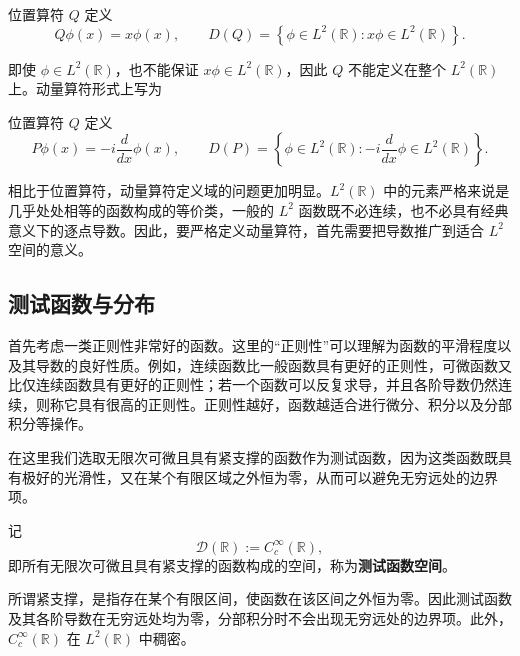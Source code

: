 \documentclass[UTF8,a4paper,11pt,openany]{ctexbook}
\begin{document}
\begin{definition}[位置算符]
位置算符 $Q$ 定义
\begin{equation}
    Q\phi(x)=x\phi(x),
    \qquad
    D(Q)
    =
    \left\{
    \phi\in L^2(\mathbb R):
    x\phi\in L^2(\mathbb R)
    \right\}.
\end{equation}
\end{definition}
即使 $\phi\in L^2(\mathbb R)$，也不能保证 $x\phi\in L^2(\mathbb R)$，因此 $Q$ 不能定义在整个 $L^2(\mathbb R)$ 上。动量算符形式上写为
\begin{definition}[动量算符]
位置算符 $Q$ 定义
\begin{equation}
    P\phi(x)=-i\frac{d}{dx}\phi(x),
    \qquad
    D(P)
    =
    \left\{
    \phi\in L^2(\mathbb R):
    -i\frac{d}{dx}\phi\in L^2(\mathbb R)
    \right\}.
\end{equation}
\end{definition}

相比于位置算符，动量算符定义域的问题更加明显。$L^2(\mathbb R)$ 中的元素严格来说是几乎处处相等的函数构成的等价类，一般的 $L^2$ 函数既不必连续，也不必具有经典意义下的逐点导数。因此，要严格定义动量算符，首先需要把导数推广到适合 $L^2$ 空间的意义。

\subsection{测试函数与分布}

首先考虑一类正则性非常好的函数。这里的“正则性”可以理解为函数的平滑程度以及其导数的良好性质。例如，连续函数比一般函数具有更好的正则性，可微函数又比仅连续函数具有更好的正则性；若一个函数可以反复求导，并且各阶导数仍然连续，则称它具有很高的正则性。正则性越好，函数越适合进行微分、积分以及分部积分等操作。

在这里我们选取无限次可微且具有紧支撑的函数作为测试函数，因为这类函数既具有极好的光滑性，又在某个有限区域之外恒为零，从而可以避免无穷远处的边界项。

\begin{definition}[测试函数空间]
记
\begin{equation}
    \mathcal D(\mathbb R)
    :=
    C_c^\infty(\mathbb R),
\end{equation}
即所有无限次可微且具有紧支撑的函数构成的空间，称为\textbf{测试函数空间}。
\end{definition}

所谓紧支撑，是指存在某个有限区间，使函数在该区间之外恒为零。因此测试函数及其各阶导数在无穷远处均为零，分部积分时不会出现无穷远处的边界项。此外，$C_c^\infty(\mathbb R)$ 在 $L^2(\mathbb R)$ 中稠密。
\end{document}
